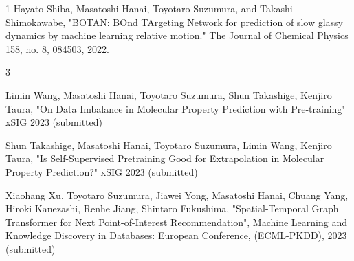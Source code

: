 

% 
\begin{雑誌論文}{1}
Hayato Shiba, Masatoshi Hanai, Toyotaro Suzumura, and Takashi Shimokawabe, "BOTAN: BOnd TArgeting Network for prediction of slow glassy dynamics by machine learning relative motion." The Journal of Chemical Physics 158, no. 8, 084503, 2022.
\end{雑誌論文}

\begin{査読付}{3}

Limin Wang, Masatoshi Hanai, Toyotaro Suzumura, Shun Takashige, Kenjiro Taura, "On Data Imbalance in Molecular Property Prediction with Pre-training" xSIG 2023 (submitted)

Shun Takashige, Masatoshi Hanai, Toyotaro Suzumura, Limin Wang, Kenjiro Taura, "Is Self-Supervised Pretraining Good for Extrapolation in Molecular Property Prediction?" xSIG 2023 (submitted)

Xiaohang Xu, Toyotaro Suzumura, Jiawei Yong, Masatoshi Hanai, Chuang Yang, Hiroki Kanezashi, Renhe Jiang, Shintaro Fukushima, "Spatial-Temporal Graph Transformer for Next Point-of-Interest Recommendation", Machine Learning and Knowledge Discovery in Databases: European Conference, (ECML-PKDD), 2023 (submitted)

\end{査読付}







